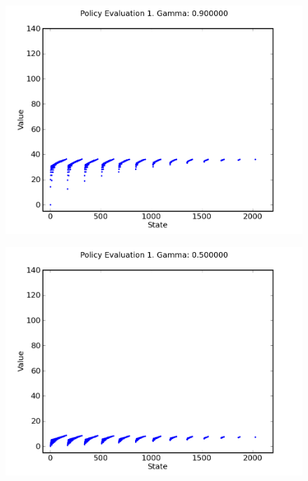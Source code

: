 \documentclass[a4paper]{article}
\begin{document}
\begin{figure}[h]
\center
\includegraphics[scale=0.8]{gamma_iteration/gamma_9_1.png}
\end{figure}

\begin{figure}[h]
\center
\includegraphics[scale=0.8]{gamma_iteration/gamma_5_1.png}
\end{figure}
\end{document}
